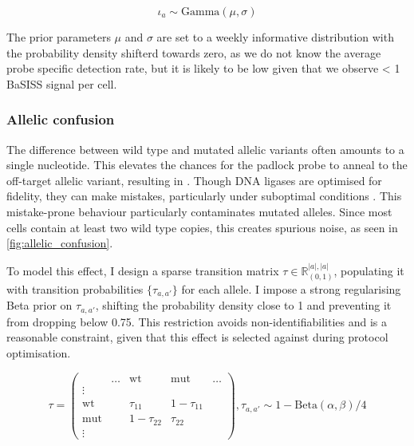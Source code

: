 \begin{equation}
    {\iota}_{a} \sim \text{Gamma}(\mu, \sigma)
\end{equation}

The prior parameters $\mu$ and $\sigma$ are set to a weekly informative distribution with the probability density shifterd towards zero, as we do not know the average probe specific detection rate, but it is likely to be low given that we observe < 1 \ac{BaSISS} signal per cell.

\subsubsection*{Allelic confusion}

The difference between wild type and mutated allelic variants often amounts to a single nucleotide. This elevates the chances for the padlock probe to anneal to the off-target allelic variant, resulting in . Though DNA ligases are optimised for fidelity, they can make mistakes, particularly under suboptimal conditions \parencite{Lohman2016-ec}. This mistake-prone behaviour particularly contaminates mutated alleles. Since most cells contain at least two wild type copies, this creates spurious noise, as seen in \cref{fig:allelic_confusion}.

To model this effect, I design a sparse transition matrix ${\tau} \in \mathbb{R}^{|a|, |a|}_{(0,1)} $, populating it with transition probabilities $ \{ {\tau}_{a,a'}\} $ for each allele. I impose a strong regularising Beta prior on $ \tau_{a,a'} $, shifting the probability density close to 1 and preventing it from dropping below 0.75. This restriction avoids non-identifiabilities and is a reasonable constraint, given that this effect is selected against during protocol optimisation.

\begin{equation}
 {\tau} = \left(\begin{array}{c|cccc}
       & \ldots & \text{wt} & \text{mut} & \ldots \\ 
\hline
 \vdots &  &        &        & \\
\text{wt}      &  & \tau_{11} & 1-\tau_{11} &  \\
\text{mut}     &  & 1-\tau_{22} & \tau_{22} &  \\
\vdots  &  &        &        & 
\end{array}\right), {\tau}_{a,a'} \sim 1-\text{Beta}(\alpha, \beta)/4
\end{equation}

